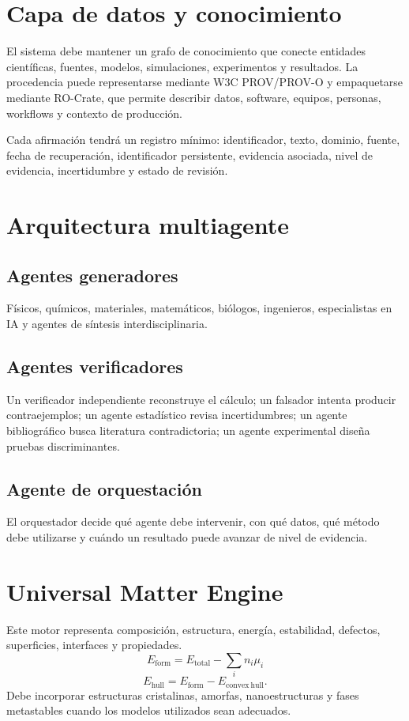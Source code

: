 \documentclass[11pt,a4paper]{article}
\begin{document}
\section{Capa de datos y conocimiento}
El sistema debe mantener un grafo de conocimiento que conecte entidades científicas, fuentes, modelos, simulaciones, experimentos y resultados. La procedencia puede representarse mediante W3C PROV/PROV-O y empaquetarse mediante RO-Crate, que permite describir datos, software, equipos, personas, workflows y contexto de producción. \cite{prov,provo,rocrate}

Cada afirmación tendrá un registro mínimo: identificador, texto, dominio, fuente, fecha de recuperación, identificador persistente, evidencia asociada, nivel de evidencia, incertidumbre y estado de revisión.

\section{Arquitectura multiagente}
\subsection{Agentes generadores}
Físicos, químicos, materiales, matemáticos, biólogos, ingenieros, especialistas en IA y agentes de síntesis interdisciplinaria.
\subsection{Agentes verificadores}
Un verificador independiente reconstruye el cálculo; un falsador intenta producir contraejemplos; un agente estadístico revisa incertidumbres; un agente bibliográfico busca literatura contradictoria; un agente experimental diseña pruebas discriminantes.
\subsection{Agente de orquestación}
El orquestador decide qué agente debe intervenir, con qué datos, qué método debe utilizarse y cuándo un resultado puede avanzar de nivel de evidencia.

\section{Universal Matter Engine}
Este motor representa composición, estructura, energía, estabilidad, defectos, superficies, interfaces y propiedades.
\[
E_{\mathrm{form}}=E_{\mathrm{total}}-\sum_i n_i\mu_i
\]
\[
E_{\mathrm{hull}}=E_{\mathrm{form}}-E_{\mathrm{convex\ hull}}.
\]
Debe incorporar estructuras cristalinas, amorfas, nanoestructuras y fases metastables cuando los modelos utilizados sean adecuados.
\end{document}
